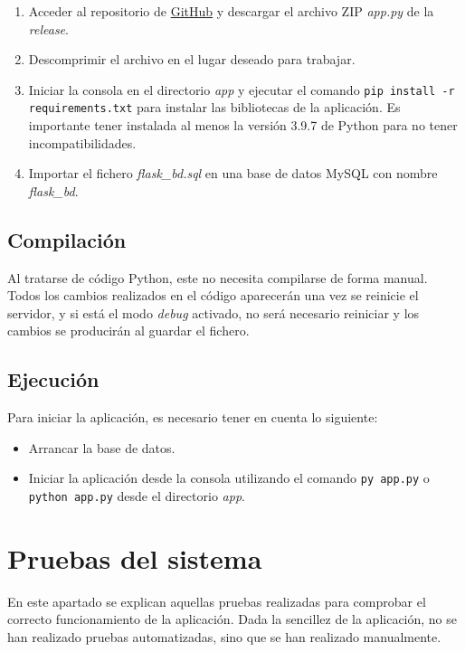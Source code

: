 \begin{enumerate}
	\item Acceder al repositorio de \href{https://github.com/xam1002/TFG_Deteccion_Parkinson}{GitHub} y descargar el archivo ZIP \textit{app.py} de la \textit{release}.
	\item Descomprimir el archivo en el lugar deseado para trabajar.
	\item Iniciar la consola en el directorio \textit{app} y ejecutar el comando \texttt{pip install -r requirements.txt} para instalar las bibliotecas de la aplicación. Es importante tener instalada al menos la versión 3.9.7 de Python para no tener incompatibilidades.
	\item Importar el fichero \textit{flask\_bd.sql} en una base de datos MySQL con nombre \textit{flask\_bd}.
\end{enumerate}

\subsection{Compilación}
Al tratarse de código Python, este no necesita compilarse de forma manual. Todos los cambios realizados en el código aparecerán una vez se reinicie el servidor, y si está el modo \textit{debug} activado, no será necesario reiniciar y los cambios se producirán al guardar el fichero.

\subsection{Ejecución}
Para iniciar la aplicación, es necesario tener en cuenta lo siguiente:

\begin{itemize}
	\item Arrancar la base de datos.
	\item Iniciar la aplicación desde la consola utilizando el comando \texttt{py app.py} o \texttt{python app.py} desde el directorio \textit{app}.
\end{itemize}

\section{Pruebas del sistema}
En este apartado se explican aquellas pruebas realizadas para comprobar el correcto funcionamiento de la aplicación. Dada la sencillez de la aplicación, no se han realizado pruebas automatizadas, sino que se han realizado manualmente.

